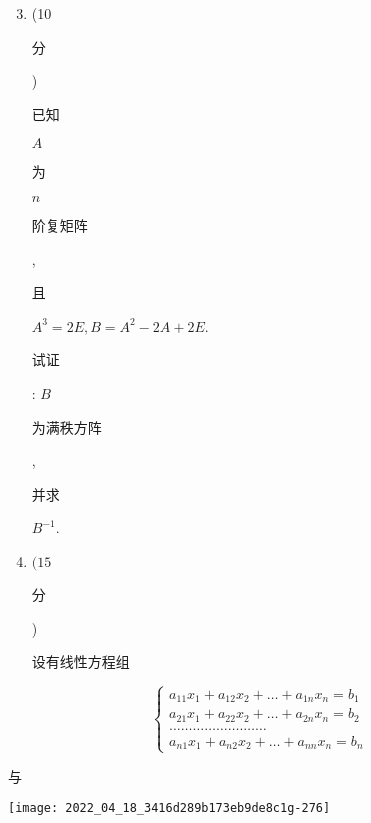 \documentclass[10pt]{article}
\begin{document}
\begin{enumerate}
  \setcounter{enumi}{2}
  \item (10 \begin{CJK}{UTF8}{mj}分\end{CJK}) \begin{CJK}{UTF8}{mj}已知\end{CJK} $A$ \begin{CJK}{UTF8}{mj}为\end{CJK} $n$ \begin{CJK}{UTF8}{mj}阶复矩阵\end{CJK}, \begin{CJK}{UTF8}{mj}且\end{CJK} $A^{3}=2 E, B=A^{2}-2 A+2 E$. \begin{CJK}{UTF8}{mj}试证\end{CJK}: $B$ \begin{CJK}{UTF8}{mj}为满秩方阵\end{CJK}, \begin{CJK}{UTF8}{mj}并求\end{CJK} $B^{-1}$.

  \item $(15$ \begin{CJK}{UTF8}{mj}分\end{CJK}) \begin{CJK}{UTF8}{mj}设有线性方程组\end{CJK}

\end{enumerate}
$$
\left\{\begin{array}{l}
a_{11} x_{1}+a_{12} x_{2}+\ldots+a_{1 n} x_{n}=b_{1} \\
a_{21} x_{1}+a_{22} x_{2}+\ldots+a_{2 n} x_{n}=b_{2} \\
\ldots \ldots \ldots \ldots \ldots \ldots . \ldots \ldots \\
a_{n 1} x_{1}+a_{n 2} x_{2}+\ldots+a_{n n} x_{n}=b_{n}
\end{array}\right.
$$
\begin{CJK}{UTF8}{mj}与\end{CJK}

\texttt{[image: 2022\_04\_18\_3416d289b173eb9de8c1g-276]}
\end{document}
